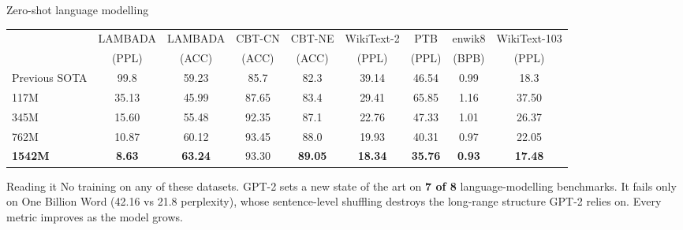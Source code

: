 \documentclass[aspectratio=169,11pt]{beamer}
\begin{document}
\begin{frame}{Zero-shot language modelling}
  \centering
  \scriptsize
  \begin{tabular}{@{}lcccccccc@{}}
    \toprule
    & LAMBADA & LAMBADA & CBT-CN & CBT-NE & WikiText-2 & PTB & enwik8 & WikiText-103\\
    & (PPL) & (ACC) & (ACC) & (ACC) & (PPL) & (PPL) & (BPB) & (PPL)\\
    \midrule
    Previous SOTA & 99.8 & 59.23 & 85.7 & 82.3 & 39.14 & 46.54 & 0.99 & 18.3\\
    117M & 35.13 & 45.99 & 87.65 & 83.4 & 29.41 & 65.85 & 1.16 & 37.50\\
    345M & 15.60 & 55.48 & 92.35 & 87.1 & 22.76 & 47.33 & 1.01 & 26.37\\
    762M & 10.87 & 60.12 & 93.45 & 88.0 & 19.93 & 40.31 & 0.97 & 22.05\\
    \textbf{1542M} & \textbf{8.63} & \textbf{63.24} & 93.30 & \textbf{89.05} & \textbf{18.34} & \textbf{35.76} & \textbf{0.93} & \textbf{17.48}\\
    \bottomrule
  \end{tabular}
  \vspace{2mm}

  \raggedright
  \begin{exampleblock}{Reading it}
    \small
    No training on any of these datasets. GPT-2 sets a new state of the art on \textbf{7 of 8} language-modelling benchmarks. It fails only on One Billion Word (42.16 vs 21.8 perplexity), whose sentence-level shuffling destroys the long-range structure GPT-2 relies on. Every metric improves as the model grows.
  \end{exampleblock}
\end{frame}
\end{document}
